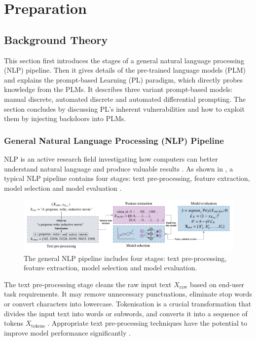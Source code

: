 \chapter{Preparation}
\section{Background Theory}
This section first introduces the stages of a general natural language processing (NLP) pipeline. Then it gives details of the pre-trained language models (PLM) and explains the prompt-based Learning (PL) paradigm, which directly probes knowledge from the PLMs. It describes three variant prompt-based models: manual discrete, automated discrete and automated differential prompting. The section concludes by discussing PL's inherent vulnerabilities and how to exploit them by injecting backdoors into PLMs. 

\subsection{General Natural Language Processing (NLP) Pipeline}
NLP is an active research field investigating how computers can better understand natural language and produce valuable results \cite{chowdhary20nlp}. As shown in , a typical NLP pipeline contains four stages: text pre-processing, feature extraction, model selection and model evaluation \cite{Vajjala20nlp}.

\begin{figure}[!ht]
    \centering
    \includegraphics[width=\hsize]{figures/preparation_media/prepare-pipeline.pdf}
    \caption{The general NLP pipeline includes four stages: text pre-processing, feature extraction, model selection and model evaluation.}
    \label{fig:prepare-pipeline}
\end{figure}

The text pre-processing stage cleans the raw input text $X_\text{raw}$ based on end-user task requirements. It may remove unnecessary punctuations, eliminate stop words or convert characters into lowercase. Tokenisation is a crucial transformation that divides the input text into words or subwords, and converts it into a sequence of tokens $X_\text{tokens}$ \cite{Grefenstette99token}. Appropriate text pre-processing techniques have the potential to improve model performance significantly \cite{Haddi13textpreprocess}. 

